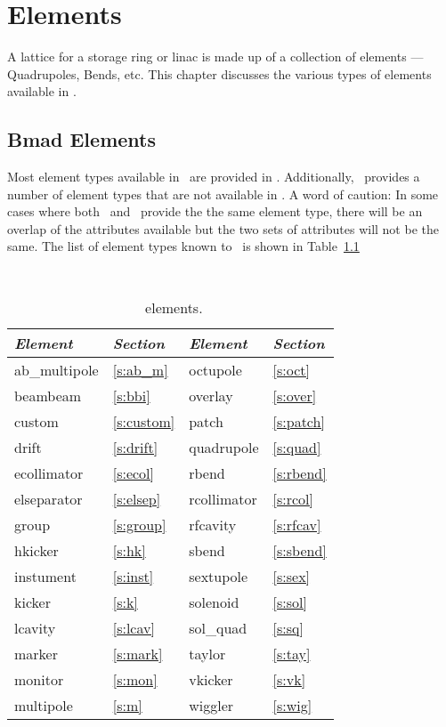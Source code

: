 \chapter{Elements}

A lattice for a storage ring or linac is made up of a collection of
elements --- Quadrupoles, Bends, etc. This chapter discusses the
various types of elements available in \bmad.

\section{Bmad Elements}

Most element types available in \mad\ are provided in \bmad.
Additionally, \bmad\ provides a number of element types that are not
available in \mad.  A word of caution: In some cases where both \mad\
and \bmad\ provide the the same element type, there will be an overlap of 
the attributes available but the two sets of attributes will not be the same.
The list of element types known to \bmad\ is shown in Table~\ref{tab:elements}
\begin{table}[h]
\centering
{\tt
\begin{tabular}{|l|l||l|l|} \hline
  {\it Element} & {\it Section}  & {\it Element} & {\it Section} \\ \hline
  ab\_multipole & \ref{s:ab_m}   &  octupole     & \ref{s:oct}   \\ \hline
  beambeam      & \ref{s:bbi}    &  overlay      & \ref{s:over}  \\ \hline
  custom        & \ref{s:custom} &  patch        & \ref{s:patch} \\ \hline
  drift         & \ref{s:drift}  &  quadrupole   & \ref{s:quad}  \\ \hline
  ecollimator   & \ref{s:ecol}   &  rbend        & \ref{s:rbend} \\ \hline
  elseparator   & \ref{s:elsep}  &  rcollimator  & \ref{s:rcol}  \\ \hline
  group         & \ref{s:group}  &  rfcavity     & \ref{s:rfcav} \\ \hline
  hkicker       & \ref{s:hk}     &  sbend        & \ref{s:sbend} \\ \hline
  instument     & \ref{s:inst}   &  sextupole    & \ref{s:sex}   \\ \hline
  kicker        & \ref{s:k}      &  solenoid     & \ref{s:sol}   \\ \hline
  lcavity       & \ref{s:lcav}   &  sol\_quad    & \ref{s:sq}    \\ \hline
  marker        & \ref{s:mark}   &  taylor       & \ref{s:tay}   \\ \hline
  monitor       & \ref{s:mon}    &  vkicker      & \ref{s:vk}    \\ \hline
  multipole     & \ref{s:m}      &  wiggler      & \ref{s:wig}   \\ \hline
\end{tabular}}
\caption{\bmad\ elements.}
\label{tab:elements}\center
\end{table}

